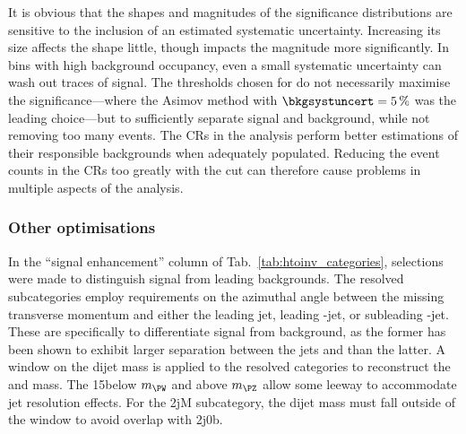 It is obvious that the shapes and magnitudes of the significance distributions are sensitive to the inclusion of an estimated systematic uncertainty. Increasing its size affects the shape little, though impacts the magnitude more significantly. In bins with high background occupancy, even a small systematic uncertainty can wash out traces of signal. The thresholds chosen for \omegaTilde do not necessarily maximise the significance---where the Asimov method with $\bkgsystuncert = \text{5\,\%}$ was the leading choice---but to sufficiently separate signal and background, while not removing too many events. The \glspl{CR} in the analysis perform better estimations of their responsible backgrounds when adequately populated. Reducing the event counts in the \glspl{CR} too greatly with the \omegaTilde cut can therefore cause problems in multiple aspects of the analysis.




\subsubsection{Other optimisations}
\label{subsubsec:htoinv_other_optimisations}

In the ``signal enhancement'' column of Tab.~\ref{tab:htoinv_categories}, selections were made to distinguish signal from leading backgrounds. The \ttH resolved subcategories employ requirements on the azimuthal angle between the missing transverse momentum and either the leading jet, leading \Pbottom-jet, or subleading \Pbottom-jet. These are specifically to differentiate \ttH signal from \ttbar background, as the former has been shown to exhibit larger separation between the \glspl{jet} and \ptmiss than the latter. A window on the dijet mass is applied to the \VH resolved categories to reconstruct the \PW and \PZ mass. The 15\GeV below $m_{\PW}$ and above $m_{\PZ}$ allow some leeway to accommodate jet resolution effects. For the \ggH 2jM subcategory, the dijet mass must fall outside of the window to avoid overlap with \VH 2j0b.
